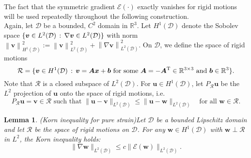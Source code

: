 \documentclass[11pt]{article}
\numberwithin{equation}{section}
\newcommand{\R}{\mathbb{R}}
\newcommand{\E}{\mathcal{E}}
\newcommand{\D}{\mathcal{D}}
\newcommand{\sR}{\mathcal{R}}
\newcommand{\bu}{\bm{u}}
\newcommand{\bw}{\bm{w}}
\newcommand{\bx}{\bm{x}}
\newcommand{\bv}{\bm{v}}
\newcommand{\ts}{\thinspace}
\newcommand{\norm}[1]{\left\lVert #1 \right\rVert}
\newtheorem{lemma}[theorem]{Lemma}
\theoremstyle{definition}
\begin{document}
The fact that the symmetric gradient $\E(\cdot)$ exactly vanishes for rigid motions will be used repeatedly throughout the following construction. \\

Again, let $\D$ be a bounded, $C^2$ domain in $\R^3$. Let $H^1(\D)$ denote the Sobolev space $\{\bv\in L^2(\D) \ts :\ts \nabla\bv\in L^2(\D)\}$ with norm $\norm{\bv}_{H^1(\D)}^2:= \norm{\bv}_{L^2(\D)}^2+\norm{\nabla\bv}_{L^2(\D)}^2$. On $\D$, we define the space of rigid motions 
\[ \mathcal{R} = \{ \bv\in H^1(\D) \ts : \ts \bv = \bm{A}\bx + \bm{b} \text{ for some } \bm{A}= -\bm{A}^{\rm T} \in \R^{3\times 3} \text{ and } \bm{b}\in \R^3\}.\]
Note that $\sR$ is a closed subspace of $L^2(\D)$. For $\bu\in H^1(\D)$, let $P_{\mathcal{R}}\bu$ be the $L^2$ projection of $\bu$ onto the space of rigid motions, i.e. 
\[ P_{\mathcal{R}}\bu = \bv\in \mathcal{R} \text{ such that } \|\bu-\bv\|_{L^2(\D)} \le \|\bu - \bw\|_{L^2(\D)}\quad  \text{for all } \bw\in \mathcal{R}. \]

\begin{lemma}\emph{(Korn inequality for pure strain)}\label{korn_nonrigid}
Let $\D$ be a bounded Lipschitz domain and let $\sR$ be the space of rigid motions on $\D$. For any $\bw\in H^1(\D)$ with $\bw\perp \sR$ in $L^2$, the Korn inequality holds:
\[ \|\nabla\bw\|_{L^2(\D)} \le c\|\E(\bw)\|_{L^2(\D)}.\] 
\end{lemma}
\end{document}
